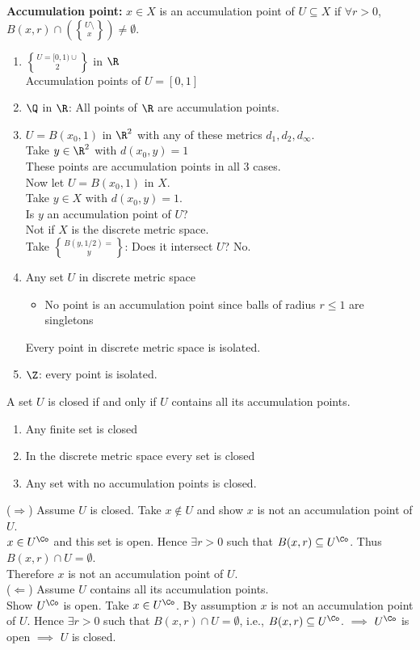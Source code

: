 \textbf{Accumulation point:} $x\in X$ is an accumulation point of $U\subseteq X$ if $\forall r>0$, $B(x,r)\cap(U\setminus\brace x)\neq\emptyset$.

\ex \begin{enumerate}
\item $U=[0,1)\cup\brace2$ in $\R$ \\
Accumulation points of $U=[0,1]$
\item $\Q$ in $\R$: All points of $\R$ are accumulation points.
\item $U=B(x_0,1)$ in $\R^2$ with any of these metrics $d_1,d_2,d_\infty$.%
\\ Take $y\in\R^2$ with $d(x_0,y)=1$ \\
These points are accumulation points in all 3 cases. \\
Now let $U=B(x_0,1)$ in $X$. \\
Take $y\in X$ with $d(x_0,y)=1$. \\
Is $y$ an accumulation point of $U$? \\
Not if $X$ is the discrete metric space. \\
Take $B(y,1/2)=\brace y$: Does it intersect $U$?  No.
\item Any set $U$ in discrete metric space
\begin{itemize}
\item No point is an accumulation point since balls of radius $r\leq1$ are singletons
\end{itemize}
Every point in discrete metric space is isolated.
\item $\Z$: every point is isolated.
\end{enumerate}
\thm A set $U$ is closed if and only if $U$ contains all its accumulation points.

\cor \begin{enumerate}
\item Any finite set is closed
\item In the discrete metric space every set is closed
\item Any set with no accumulation points is closed.
\end{enumerate}
\pf ($\Longrightarrow$) Assume $U$ is closed.  Take $x\notin U$ and show $x$ is not an accumulation point of $U$. \\
$x\in U^\Co$ and this set is open.  Hence $\exists r>0$ such that $B(x,r)\subseteq U^\Co$.  Thus $B(x,r)\cap U=\emptyset$. \\
Therefore $x$ is not an accumulation point of $U$. \\
($\Longleftarrow$) Assume $U$ contains all its accumulation points. \\
Show $U^\Co$ is open.  Take $x\in U^\Co$.  By assumption $x$ is not an accumulation point of $U$.  Hence $\exists r>0$ such that $B(x,r)\cap U=\emptyset$, i.e., $B(x,r)\subseteq U^\Co$. $\implies$ $U^\Co$ is open $\implies$ $U$ is closed.

